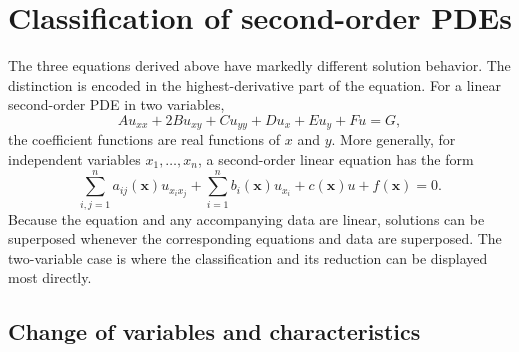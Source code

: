 \section{Classification of second-order PDEs}

The three equations derived above have markedly different solution behavior. The distinction is encoded in the highest-derivative part of the equation. For a linear second-order PDE in two variables,
\begin{equation}
A u_{xx}+2B u_{xy}+C u_{yy}+D u_x+E u_y+Fu=G,
\label{eq:ch04-general-second-order}
\end{equation}
the coefficient functions are real functions of $x$ and $y$. More generally, for independent variables $x_1,\ldots,x_n$, a second-order linear equation has the form
\begin{equation}
\sum_{i,j=1}^n a_{ij}(\mathbf{x})u_{x_ix_j}
+\sum_{i=1}^n b_i(\mathbf{x})u_{x_i}+c(\mathbf{x})u+f(\mathbf{x})=0.
\end{equation}
Because the equation and any accompanying data are linear, solutions can be superposed whenever the corresponding equations and data are superposed. The two-variable case is where the classification and its reduction can be displayed most directly.

\subsection{Change of variables and characteristics}

